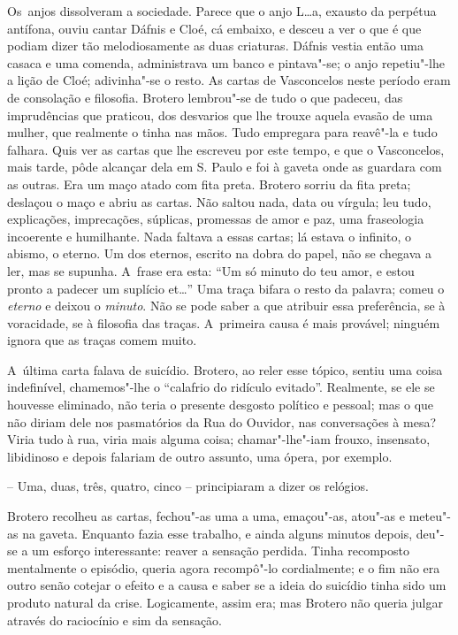 Os~anjos dissolveram a sociedade. Parece que o anjo L\ldots{}a, exausto da
perpétua antífona, ouviu cantar Dáfnis e Cloé, cá embaixo, e desceu a
ver o que é que podiam dizer tão melodiosamente as duas criaturas.
Dáfnis vestia então uma casaca e uma comenda, administrava um banco e
pintava"-se; o anjo repetiu"-lhe a lição de Cloé; adivinha"-se o resto. As
cartas de Vasconcelos neste período eram de consolação e filosofia.
Brotero lembrou"-se de tudo o que padeceu, das imprudências que praticou,
dos desvarios que lhe trouxe aquela evasão de uma mulher, que realmente
o tinha nas mãos. Tudo empregara para reavê"-la e tudo falhara. Quis ver
as cartas que lhe escreveu por este tempo, e que o Vasconcelos, mais
tarde, pôde alcançar dela em S. Paulo e foi à gaveta onde as guardara
com as outras. Era um maço atado com fita preta. Brotero sorriu da fita
preta; deslaçou o maço e abriu as cartas. Não saltou nada, data ou
vírgula; leu tudo, explicações, imprecações, súplicas, promessas de amor
e paz, uma fraseologia incoerente e humilhante. Nada faltava a essas
cartas; lá estava o infinito, o abismo, o eterno. Um dos eternos,
escrito na dobra do papel, não se chegava a ler, mas se supunha. A~frase
era esta: ``Um só minuto do teu amor, e estou pronto a padecer um
suplício et\ldots{}'' Uma traça bifara o resto da palavra; comeu o
\emph{eterno} e deixou o \emph{minuto}. Não se pode saber a que atribuir
essa preferência, se à voracidade, se à filosofia das traças. A~primeira
causa é mais provável; ninguém ignora que as traças comem muito.

A~última carta falava de suicídio. Brotero, ao reler esse tópico, sentiu
uma coisa indefinível, chamemos"-lhe o ``calafrio do ridículo evitado''.
Realmente, se ele se houvesse eliminado, não teria o presente desgosto
político e pessoal; mas o que não diriam dele nos pasmatórios da Rua do
Ouvidor, nas conversações à mesa? Viria tudo à rua, viria mais alguma
coisa; chamar"-lhe"-iam frouxo, insensato, libidinoso e depois falariam de
outro assunto, uma ópera, por exemplo.

-- Uma, duas, três, quatro, cinco -- principiaram a dizer os relógios.

Brotero recolheu as cartas, fechou"-as uma a uma, emaçou"-as, atou"-as e
meteu"-as na gaveta. Enquanto fazia esse trabalho, e ainda alguns minutos
depois, deu"-se a um esforço interessante: reaver a sensação perdida.
Tinha recomposto mentalmente o episódio, queria agora recompô"-lo
cordialmente; e o fim não era outro senão cotejar o efeito e a causa e
saber se a ideia do suicídio tinha sido um produto natural da crise.
Logicamente, assim era; mas Brotero não queria julgar através do
raciocínio e sim da sensação.

